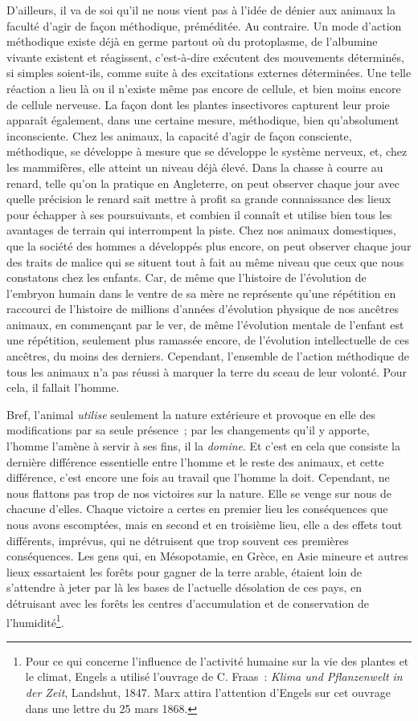 \documentclass[french,twoside]{book} %
\begin{document}
D’ailleurs, il va de soi qu’il ne nous vient pas à l’idée de dénier aux animaux la faculté d’agir de façon méthodique, préméditée. Au contraire. Un mode d’action méthodique existe déjà en germe partout où du protoplasme, de l’albumine vivante existent et réagissent, c’est-à-dire exécutent des mouvements déterminés, si simples soient-ils, comme suite à des excitations externes déterminées. Une telle réaction a lieu là ou il n’existe même pas encore de cellule, et bien moins encore de cellule nerveuse. La façon dont les plantes insectivores capturent leur proie apparaît également, dans une certaine mesure, méthodique, bien qu’absolument inconsciente. Chez les animaux, la capacité d’agir de façon consciente, méthodique, se développe à mesure que se développe le système nerveux, et, chez les mammifères, elle atteint un niveau déjà élevé. Dans la chasse à courre au renard, telle qu’on la pratique en Angleterre, on peut observer chaque jour avec quelle précision le renard sait mettre à profit sa grande connaissance des lieux pour échapper à ses poursuivants, et combien il connaît et utilise bien tous les avantages de terrain qui interrompent la piste. Chez nos animaux domestiques, que la société des hommes a développés plus encore, on peut observer chaque jour des traits de malice qui se situent tout à fait au même niveau que ceux que nous constatons chez les enfants. Car, de même que l’histoire de l’évolution de l’embryon humain dans le ventre de sa mère ne représente qu’une répétition en raccourci de l’histoire de millions d’années d’évolution physique de nos ancêtres animaux, en commençant par le ver, de même l’évolution mentale de l’enfant est une répétition, seulement plus ramassée encore, de l’évolution intellectuelle de ces ancêtres, du moins des derniers. Cependant, l’ensemble de l’action méthodique de tous les animaux n’a pas réussi à marquer la terre du sceau de leur volonté. Pour cela, il fallait l’homme.\par
Bref, l’animal \emph{utilise} seulement la nature extérieure et provoque en elle des modifications par sa seule présence ; par les changements qu’il y apporte, l’homme l’amène à servir à ses fins, il la \emph{domine}. Et c’est en cela que consiste la dernière différence essentielle entre l’homme et le reste des animaux, et cette différence, c’est encore une fois au travail que l’homme la doit. Cependant, ne nous flattons pas trop de nos victoires sur la nature. Elle se venge sur nous de chacune d’elles. Chaque victoire a certes en premier lieu les conséquences que nous avons escomptées, mais en second et en troisième lieu, elle a des effets tout différents, imprévus, qui ne détruisent que trop souvent ces premières conséquences. Les gens qui, en Mésopotamie, en Grèce, en Asie mineure et autres lieux essartaient les forêts pour gagner de la terre arable, étaient loin de s’attendre à jeter par là les bases de l’actuelle désolation de ces pays, en détruisant avec les forêts les centres d’accumulation et de conservation de l’humidité\footnote{Pour ce qui concerne l’influence de l’activité humaine sur la vie des plantes et le climat, Engels a utilisé l’ouvrage de C. Fraas : \emph{Klima und Pflanzenwelt in der Zeit}, Landshut, 1847. Marx attira l’attention d’Engels sur cet ouvrage dans une lettre du 25 mars 1868.}.\par
\end{document}
